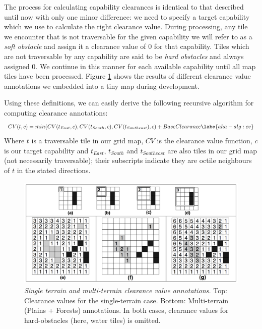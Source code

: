 The process for calculating capability clearances is identical to that described until now with only one minor difference: we need to specify a target capability which we use to calculate the right clearance value. During processing, any tile we encounter that is not traversable for the given capability we will refer to as a \emph{soft obstacle} and assign it a clearance value of 0 for that capability. Tiles which are not traversable by any capability are said to be \emph{hard obstacles} and always assigned 0.  We continue in this manner for each available capability until all map tiles have been processed. Figure \ref{aha-fig:annotations} shows the results of different clearance value annotations we embedded into a tiny map during development.

Using these definitions, we can easily derive the following recursive algorithm for computing clearance annotations:
\begin{equation}
CV(t,c) = min(CV(t_{East}, c), CV(t_{South}, c), CV(t_{Southeast}), c) + BaseClearance
\labe{aha-alg:cv}
\end{equation}
Where $t$ is a traversable tile in our grid map, $CV$ is the clearance value function, $c$ is our target capability and $t_{East}$, $t_{South}$ and $t_{Southeast}$ are also tiles in our grid map (not necessarily traversable); their  subscripts indicate they are octile neighbours of $t$ in the stated directions.

\begin{figure}[htbp]
        \caption{\emph{Single terrain and multi-terrain clearance value annotations.} Top: Clearance values for the single-terrain case. Bottom: Multi-terrain (Plains + Forests) annotations. In both cases, clearance values for hard-obstacles (here, water tiles) is omitted.}
        \begin{center}
                        \includegraphics[scale=0.8]{diagrams/annotations.png}
        \end{center}
        \label{aha-fig:annotations}
\end{figure}

